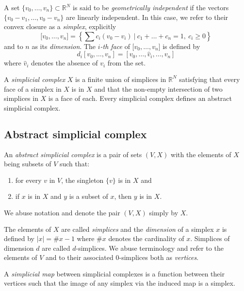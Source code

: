 \documentclass{amsart}
\begin{document}
	A set $\{v_0, \dots, v_n\} \subset \mathbb{R}^N$ is said to be \textit{geometrically independent} if the vectors $\{v_0-v_1, \dots, v_0-v_n\}$ are linearly independent. In this case, we refer to their convex closure as a \textit{simplex}, explicitly
	\begin{equation*}
	\lbrack v_0, \dots , v_n \rbrack = \left\{ \sum c_i (v_0 - v_i)\ \big|\ c_1+\dots+c_n = 1,\ c_i \geq 0 \right\}
	\end{equation*}
	and to $n$ as its \textit{dimension}. The $i$\textit{-th face} of $\lbrack v_0, \dots, v_n \rbrack$ is defined by
	\begin{equation*}
	d_i[v_0, \ldots, v_n] = [v_0, \dots, \widehat{v}_i, \dots, v_n]
	\end{equation*}
	where $\widehat{v}_i$ denotes the absence of $v_i$ from the set.
	
	A \textit{simplicial complex} $X$ is a finite union of simplices in $\mathbb{R}^N$ satisfying that every face of a simplex in $X$ is in $X$ and that the non-empty intersection of two simplices in $X$ is a face of each. Every simplicial complex defines an 
	abstract simplicial complex.
	
	\subsection*{Abstract simplicial complex} \label{abstract_simplicial_complex}
	
	An \textit{abstract simplicial complex} is a pair of sets $(V, X)$ with the elements of $X$ being subsets of $V$ such that: 
	\begin{enumerate}
		\item for every $v$ in $V$, the singleton $\{v\}$ is in $X$ and
		\item if $x$ is in $X$ and $y$ is a subset of $x$, then $y$ is in $X$. 
	\end{enumerate}
	We abuse notation and denote the pair $(V, X)$ simply by $X$.
	
	The elements of $X$ are called \textit{simplices} and the \textit{dimension} of a simplex $x$ is defined by $|x| = \# x - 1$ where $\# x$ denotes the cardinality of $x$. Simplices of dimension $d$ are called $d$-simplices. We abuse terminology and refer to the elements of $V$ and to their associated $0$-simplices both as \textit{vertices}.
	
	A \textit{simplicial map} between simplicial complexes is a function between their vertices such that the image of any simplex via the induced map is a simplex.
	
\end{document}
